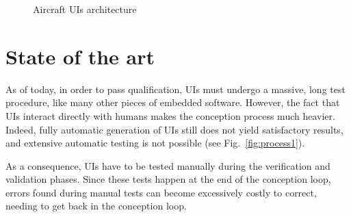 \documentclass{jdt-tis}
\begin{document}
\begin{content}
\begin{figure*}
{
}

\caption{Aircraft UIs architecture}
\label{fig:architecture}
\end{figure*}




  \section{State of the art}
  As of today, in order to pass qualification, UIs must undergo a massive, long test procedure, like many other pieces of embedded software. However, the fact that UIs interact directly with humans makes the conception process much heavier. Indeed, fully automatic generation of UIs still does not yield satisfactory results, and extensive automatic testing is not possible (see Fig.~\ref{fig:process1}).

  As a consequence, UIs have to be tested manually during the verification and validation phases. Since these tests happen at the end of the conception loop, errors found during manual tests can become excessively costly to correct, needing to get back in the conception loop.


\end{content}
\end{document}
